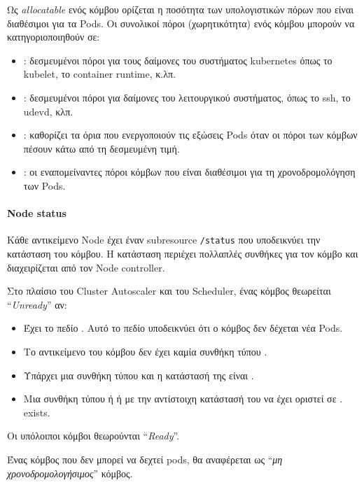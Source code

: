 Ως \textit{allocatable} ενός κόμβου ορίζεται η ποσότητα των υπολογιστικών
πόρων που είναι διαθέσιμοι για τα Pods.  Οι συνολικοί πόροι (χωρητικότητα) ενός
κόμβου μπορούν να κατηγοριοποιηθούν σε:

\begin{itemize}
      \tightlist
      \item {}: δεσμευμένοι πόροι για τους δαίμονες του
            συστήματος kubernetes όπως το kubelet, το container runtime, κ.λπ.
      \item {}: δεσμευμένοι πόροι για δαίμονες του
            λειτουργικού συστήματος, όπως το ssh, το udevd, κλπ.
      \item {}: καθορίζει τα όρια που ενεργοποιούν τις
            εξώσεις Pods όταν οι πόροι των κόμβων πέσουν κάτω από τη δεσμευμένη
            τιμή.
      \item {}: οι εναπομείναντες πόροι κόμβων που είναι
            διαθέσιμοι για τη χρονοδρομολόγηση των Pods.
\end{itemize}

\paragraph*{Node status}

Κάθε αντικείμενο Node έχει έναν subresource \texttt{/status} που υποδεικνύει την
κατάσταση του κόμβου. Η κατάσταση περιέχει πολλαπλές συνθήκες για τον κόμβο
και διαχειρίζεται από τον Node controller.

Στο πλαίσιο του Cluster Autoscaler και του Scheduler, ένας κόμβος
θεωρείται ``\textit{Unready}'' αν:
\begin{itemize}
      \tightlist
      \item Έχει το πεδίο . Αυτό το πεδίο υποδεικνύει
            ότι ο κόμβος δεν δέχεται νέα Pods.
      \item Το αντικείμενο του κόμβου δεν έχει καμία συνθήκη τύπου .
      \item Υπάρχει μια συνθήκη τύπου  και η κατάστασή της είναι
            .
      \item Μια συνθήκη τύπου  ή  ή
             με την αντίστοιχη κατάστασή του να έχει
            οριστεί σε . exists.
\end{itemize}
Οι υπόλοιποι κόμβοι θεωρούνται ``\textit{Ready}''.

Ένας κόμβος που δεν μπορεί να δεχτεί pods, θα αναφέρεται ως ``\textit{μη
      χρονοδρομολογήσιμος}'' κόμβος.


